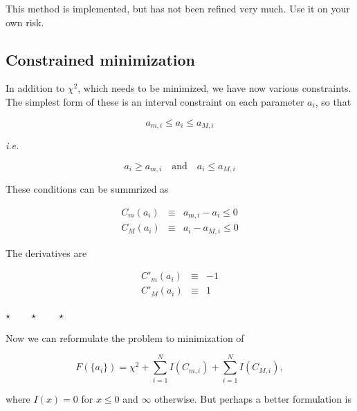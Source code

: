 \documentclass[a4paper,12pt,onecolumn]{article}
\makeatletter
\newcommand{\ie}{\emph{i.e.\@\xspace}}
\newcommand{\stars}{\begin{center} \vspace{0.5cm}$\star \qquad \star \qquad \star$\vspace{0.5cm}\end{center}}
\makeatother
\begin{document}
This method is implemented, but has not been refined very much.
Use it on your own risk.


















\subsection{Constrained minimization}

In addition to $\chi^2$, which needs to be minimized, we have now
various constraints. The simplest form of these is an
interval constraint on each parameter $a_i$, so that

\begin{equation}
a_{m,i} \le a_i \le a_{M,i}
\end{equation}

\ie

\begin{equation}
a_i \ge a_{m,i} \quad \mathrm{and} \quad a_i \le a_{M,i}
\end{equation}

These conditions can be summrized as

\begin{eqnarray}
C_m(a_i) &\equiv & a_{m,i} - a_i \le 0 \\
C_M(a_i) &\equiv & a_i - a_{M,i} \le 0
\end{eqnarray}

The derivatives are

\begin{eqnarray}
C'_m(a_i) &\equiv & -1 \\
C'_M(a_i) &\equiv & 1
\end{eqnarray}

\stars

Now we can reformulate the problem to minimization of

\begin{equation}
F(\{a_i\}) = \chi^2 + \sum_{i=1}^N I(C_{m,i}) + \sum_{i=1}^N I(C_{M,i}),
\end{equation}

where $I(x) = 0$ for $x \le 0$ and $\infty$ otherwise.
But perhaps a better formulation is
\end{document}
